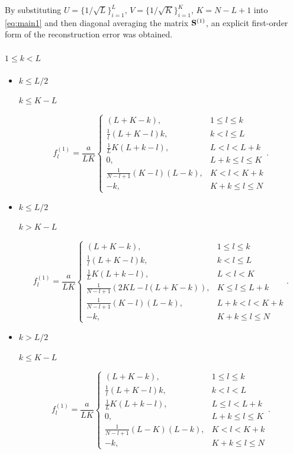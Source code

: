 \documentclass[engproc, submit, article,pdftex,moreauthors]{Definitions/mdpi}
\begin{document}
By substituting $U = \{1/\sqrt{L}\}^{L}_{i = 1},\, V = \{1/\sqrt{K}\}^{K}_{i = 1}$, $K = N - L + 1$ into \eqref{eq:main1} and then diagonal averaging the matrix $\mathbf{S}^{(1)}$, an explicit first-order form of the reconstruction error was obtained.

\paragraph{$1 \leq k < L$}
\begin{itemize}
\item
$k \leq L/2$

$k \leq K - L$

$$f^{(1)}_l = \frac{a}{{LK}}
\begin{cases}
	(L + K - k), & \text{$1 \leq l \leq k$}\\
	\frac{1}{l}(L + K - l)k, & \text{$k < l \leq L$}\\
	\frac{1}{L}K(L + k - l), &\text{$L < l < L + k$}\\
	0, &\text{$L + k \leq l \leq K$}\\
	\frac{1}{N - l + 1}(K - l)(L - k), &\text{$K < l < K + k$}\\
	-k, &\text{$K + k \leq l \leq N $}
\end{cases}.
$$

\item
$k \leq L/2$

$k > K - L$

$$f^{(1)}_l = \frac{a}{{LK}}
\begin{cases}
	(L + K - k), & \text{$1 \leq l \leq k$}\\
	\frac{1}{l}(L + K - l)k, & \text{$k < l \leq L$}\\
	\frac{1}{L}K(L + k- l), &\text{$L < l < K$}\\
	\frac{1}{N - l + 1}(2KL - l(L + K - k)), &\text{$K \leq l \leq L + k$}\\
	\frac{1}{N - l + 1}( K - l)(L - k), &\text{$L + k < l < K + k$}\\
	-k, &\text{$K + k \leq l \leq N$}
\end{cases}.
$$

\item
$k > L/2$

$k \leq K - L$

$$f^{(1)}_l = \frac{a}{{LK}}
\begin{cases}
	(L + K - k), & \text{$1 \leq l \leq k$}\\
	\frac{1}{l}(L + K - l)k, & \text{$k < l < L$}\\
	\frac{1}{L}K(L + k - l), &\text{$L \leq l < L + k$}\\
	0, &\text{$L + k \leq l \leq K$}\\
	\frac{1}{N - l + 1}(L - K)(L - k), &\text{$K < l < K + k$}\\
	-k, &\text{$K + k \leq l \leq N$}
\end{cases}.
$$


\end{itemize}
\end{document}

